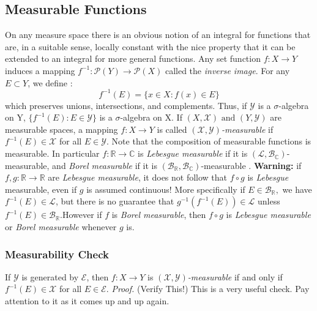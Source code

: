 \documentclass{article}
\begin{document}
\subsection{Measurable Functions}
On any measure space there is an obvious notion of an integral for functions that are, in a suitable sense, locally constant with the nice property that it can be extended to an integral for more general functions. Any set function $f:X\to Y$ induces a mapping $f^{-1}: \mathcal{P}(Y) \to \mathcal{P}(X)$ called the \emph{inverse image}. For any $E\subset Y$, we define :
\[
f^{-1}(E)=\{x\in X:f(x) \in E\}
\] which preserves unions, intersections, and complements. Thus, if $\mathcal{Y}$ is a $\sigma$-algebra on Y, $\{f^{-1}(E):E \in \mathcal{Y}\}$ is a $\sigma$-algebra on X. If $(X, \mathcal{X})\text{ and } (Y, \mathcal{Y})$ are measurable spaces, a mapping $f:X\to Y$ is called  \emph{$(\mathcal{X}, \mathcal{Y})$-measurable} if $f^{-1}(E) \in \mathcal{X}$ for all $E \in \mathcal{Y}$. Note that the composition of measurable functions is measurable. In particular $f:\mathbb{R}\to\mathbb{C}$ is \emph{Lebesgue measurable} if it is $(\mathcal{L},\mathcal{B}_\mathbb{C})$-measurable, and \emph{Borel measurable} if it is $(\mathcal{B}_\mathbb{R},\mathcal{B}_\mathbb{C})$-measurable . \newline \newline
\textbf{Warning:} if $f,g:\mathbb{R}\to\mathbb{R}$ are \emph{Lebesgue measurable}, it does not follow that $f\circ g$ is \emph{Lebesgue} measurable, even if $g$ is assumed continuous! More specifically if $E\in \mathcal{B}_\mathbb{R},$ we have $f^{-1}(E)\in \mathcal{L}$, but there is no guarantee that $g^{-1}(f^{-1}(E))\in \mathcal{L}$ unless $f^{-1}(E) \in \mathcal{B}_\mathbb{R}$.However if $f$ is \emph{Borel measurable}, then $f\circ g$ is \emph{Lebesgue  measurable} or \emph{Borel measurable} whenever $g$ is.

\subsubsection{Measurability Check}
If $\mathcal{Y}$ is generated by $\mathcal{E}$, then $f:X\to Y$ is \emph{$(\mathcal{X}, \mathcal{Y})$-measurable} if and only if $f^{-1}(E)\in \mathcal{X}$ for all $E \in\mathcal{E}$.\newline \newline 
\textit{Proof.}\newline \newline 
(Verify This!) \newline \newline
This is a very useful check. Pay attention to it as it comes up and up again.
\end{document}
